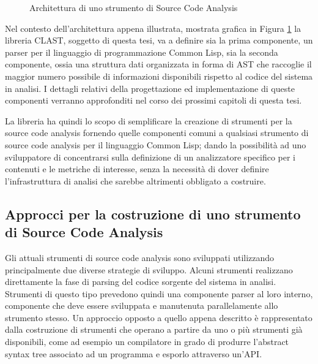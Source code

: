 \begin{figure}
\caption{Architettura di uno strumento di Source Code Analysis}
\label{fig:sca-tool-architecture}
\end{figure}

Nel contesto dell'architettura appena illustrata, mostrata grafica in Figura
\ref{fig:sca-tool-architecture} la libreria CLAST, soggetto di questa tesi, va a
definire sia la prima componente, un parser per il linguaggio di programmazione
Common Lisp, sia la seconda componente, ossia una struttura dati organizzata in
forma di AST che raccoglie il maggior numero possibile di informazioni
disponibili rispetto al codice del sistema in analisi. I dettagli relativi della
progettazione ed implementazione di queste componenti verranno approfonditi nel
corso dei prossimi capitoli di questa tesi.

La libreria ha quindi lo scopo di semplificare la creazione di strumenti per la
source code analysis fornendo quelle componenti comuni a qualsiasi strumento di
source code analysis per il linguaggio Common Lisp; dando la possibilità ad uno
sviluppatore di concentrarsi sulla definizione di un analizzatore specifico per
i contenuti e le metriche di interesse, senza la necessità di dover definire
l'infrastruttura di analisi che sarebbe altrimenti obbligato a costruire.

\subsection{Approcci per la costruzione di uno strumento di Source Code
Analysis}
\label{sca-approches}

Gli attuali strumenti di source code analysis sono sviluppati utilizzando
principalmente due diverse strategie di sviluppo. Alcuni strumenti realizzano
direttamente la fase di parsing del codice sorgente del sistema in analisi.
Strumenti di questo tipo prevedono quindi una componente parser al loro interno,
componente che deve essere sviluppata e manutenuta parallelamente allo strumento
stesso. Un approccio opposto a quello appena descritto è rappresentato dalla
costruzione di strumenti che operano a partire da uno o più strumenti già
disponibili, come ad esempio un compilatore in grado di produrre l'abstract
syntax tree associato ad un programma e esporlo attraverso un’API.

